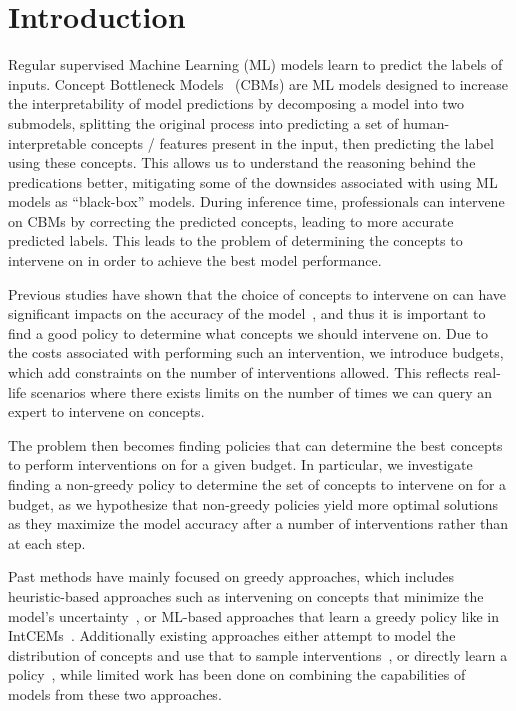 \documentclass[../main.tex]{subfiles}
\begin{document}
\chapter{Introduction}
\label{firstcontentpage}


Regular supervised Machine Learning (ML) models learn to 
predict the labels of inputs.
Concept Bottleneck Models~\cite{cbm} (CBMs) are 
ML models designed to increase the interpretability of model predictions by decomposing a model into
two submodels, splitting the original process into predicting a set of human-interpretable
concepts / features present in the input, then predicting the label using these concepts.
This allows us to understand the reasoning behind the predications better, 
mitigating some of the downsides associated with using ML models as ``black-box'' models.
During inference time, professionals can intervene on CBMs by correcting
the predicted concepts, leading to more accurate predicted labels. 
This leads to the problem of determining the concepts to intervene on in order
to achieve the best model performance.

Previous studies have shown that the choice of concepts to 
intervene on can have significant impacts on the accuracy of the model~\cite{coop, intcem},
and thus it is important to find a good policy to determine what concepts
we should intervene on.
Due to the costs
associated with performing such an intervention, we introduce budgets,
which add constraints on the number of interventions allowed. 
This
reflects real-life scenarios where
there exists limits on the number of times we 
can query an expert to intervene on concepts.

The problem then becomes finding policies that can determine the best 
concepts to perform interventions on for a given budget. In particular,
we investigate finding a non-greedy policy to determine
the set of concepts to intervene on for a budget,
as we hypothesize that non-greedy policies
yield more optimal solutions as they maximize 
the model accuracy after a number of interventions rather than at each step.

Past methods have mainly focused on greedy approaches, which
includes heuristic-based approaches such as intervening on concepts that minimize the
model's uncertainty~\cite{coop}, or ML-based approaches that learn a greedy policy
like in IntCEMs~\cite{intcem}. Additionally existing approaches either 
attempt to model the distribution of concepts and use that
to sample interventions~\cite{energycem}, 
or directly learn a policy~\cite{intcem}, while limited
work has been done on combining the capabilities of models 
from these two approaches.
\end{document}
